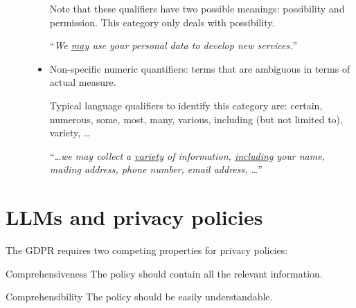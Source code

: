 \begin{description}
\begin{descriptionlist}
\begin{itemize}
\begin{remark}
                        Note that these qualifiers have two possible meanings: possibility and permission. This category only deals with possibility.
                    \end{remark}
                    \begin{example}
                        ``\textit{We \underline{may} use your personal data to develop new services.}''
                    \end{example}

                    \item Non-specific numeric quantifiers: terms that are ambiguous in terms of actual measure.
                    \begin{remark}
                        Typical language qualifiers to identify this category are: certain, numerous, some, most, many, various, including (but not limited to), variety, \dots
                    \end{remark}
                    \begin{example}
                        ``\textit{\textnormal{\dots}we may collect a \underline{variety} of information, \underline{including} your name, mailing address, phone number, email address, \dots}''
                    \end{example}
                \end{itemize}
        \end{descriptionlist}
\end{description}



\section{LLMs and privacy policies}

\begin{remark}
    The GDPR requires two competing properties for privacy policies:
    \begin{descriptionlist}
        \item[Comprehensiveness] The policy should contain all the relevant information.
        \item[Comprehensibility] The policy should be easily understandable.
    \end{descriptionlist}
\end{remark}


